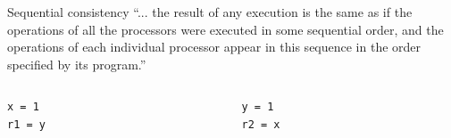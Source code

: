 \documentclass[aspectratio=169,compress]{beamer}
\begin{document}
\begin{frame}[fragile]{Sequential consistency}{}
  ``... the result of any execution is the same as if the operations of all the processors were executed in some 
  sequential order, and the operations of each individual processor appear in this sequence in the order 
  specified by its program.'' 

	\begin{columns}
			\begin{column}{0.2\textwidth}
\begin{lstlisting}[title={Thread 1}]
x = 1
r1 = y
\end{lstlisting}
			\end{column}
			\begin{column}{0.2\textwidth}
\begin{lstlisting}[title={Thread 2}]
y = 1
r2 = x
\end{lstlisting}
			\end{column}
	\end{columns}

\end{frame}
\end{document}
